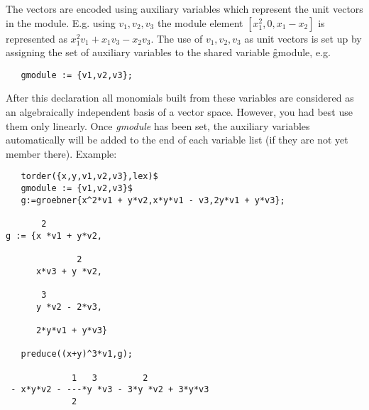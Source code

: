 The vectors are encoded using auxiliary variables which represent
the unit vectors in the module. E.g. using ${v_1,v_2,v_3}$ the
module element $[x_1^2,0,x_1-x_2]$ is represented as
$x_1^2 v_1 + x_1 v_3 - x_2 v_3$. The use of ${v_1,v_2,v_3}$
as unit vectors is set up by assigning the set of auxiliary variables
to the shared variable \hypertarget{reserved:GMODULE}{\f{gmodule}}, e.g.
\begin{verbatim}
   gmodule := {v1,v2,v3};
\end{verbatim}
After this declaration all monomials built from these variables
are considered as an algebraically independent basis of a vector
space. However, you had best use them only linearly. Once \emph{gmodule}
has been set, the auxiliary variables automatically will be
added to the end of each variable list (if they are not yet
member there).
Example:
\begin{verbatim}
   torder({x,y,v1,v2,v3},lex)$
   gmodule := {v1,v2,v3}$
   g:=groebner{x^2*v1 + y*v2,x*y*v1 - v3,2y*v1 + y*v3};

       2
g := {x *v1 + y*v2,

              2
      x*v3 + y *v2,

       3
      y *v2 - 2*v3,

      2*y*v1 + y*v3}

   preduce((x+y)^3*v1,g);

             1   3         2
 - x*y*v2 - ---*y *v3 - 3*y *v2 + 3*y*v3
             2
\end{verbatim}

